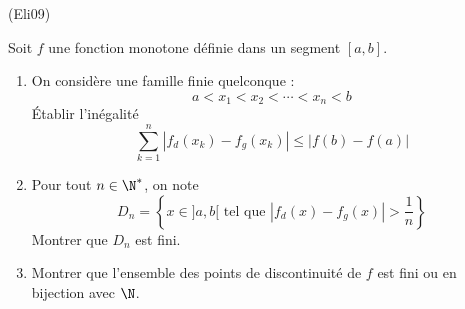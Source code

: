 \begin{tiny}(Eli09)\end{tiny} Soit $f$ une fonction monotone définie dans un segment $[a,b]$.
\begin{enumerate}
 \item On considère une famille finie quelconque :
\begin{displaymath}
 a<x_1<x_2<\cdots<x_n<b
\end{displaymath}
\'Etablir l'inégalité
\begin{displaymath}
 \sum_{k=1}^n \left| f_d(x_k) - f_g(x_k)\right| \leq \left| f(b) - f(a)\right| 
\end{displaymath}
\item Pour tout $n\in \N^*$, on note
\begin{displaymath}
 D_n = \left\lbrace x\in ]a,b[ \text{ tel que } \left| f_d(x) - f_g(x)\right|>\frac{1}{n}\right\rbrace 
\end{displaymath}
Montrer que $D_n$ est fini.
\item Montrer que l'ensemble des points de discontinuité de $f$ est fini ou en bijection avec $\N$.
\end{enumerate}
